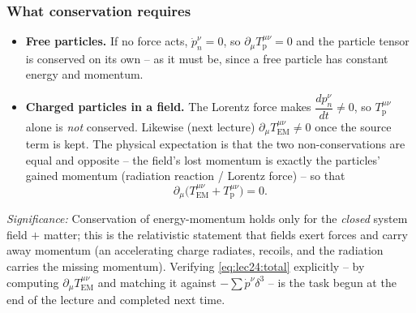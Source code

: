 \subsubsection*{What conservation requires}
\begin{itemize}
  \item \textbf{Free particles.} If no force acts, $\dot p^\nu_n=0$, so
        $\partial_\mu T^{\mu\nu}_{\text{p}}=0$ and the particle tensor is conserved on its
        own -- as it must be, since a free particle has constant energy and momentum.
  \item \textbf{Charged particles in a field.} The Lorentz force makes
        $\dfrac{dp_n^\nu}{dt}\neq0$, so $T^{\mu\nu}_{\text{p}}$ alone is \emph{not}
        conserved. Likewise (next lecture) $\partial_\mu T^{\mu\nu}_{\text{EM}}\neq0$ once
        the source term is kept. The physical expectation is that the two non-conservations
        are equal and opposite -- the field's lost momentum is exactly the particles' gained
        momentum (radiation reaction / Lorentz force) -- so that
        \begin{equation}\label{eq:lec24:total}
          \partial_\mu\big(T^{\mu\nu}_{\text{EM}}+T^{\mu\nu}_{\text{p}}\big)=0 .
        \end{equation}
\end{itemize}
\textit{Significance:} Conservation of energy-momentum holds only for the
\emph{closed} system field $+$ matter; this is the relativistic statement that fields exert
forces and carry away momentum (an accelerating charge radiates, recoils, and the radiation
carries the missing momentum). Verifying \eqref{eq:lec24:total} explicitly -- by computing
$\partial_\mu T^{\mu\nu}_{\text{EM}}$ and matching it against $-\sum\dot p^\nu\delta^3$ --
is the task begun at the end of the lecture and completed next time.

